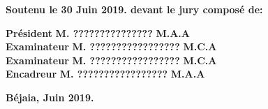\begin{titlepage}
\vspace{0.1cm}
\textbf{Soutenu le 30 Juin 2019. devant le jury composé de:}  \\
\begin{tabbing}
 \textbf{Président}  \hspace{1.2cm}\= \textbf{M. ???????????????} \hspace{2.4cm}\=\textbf{M.A.A} \\
 \textbf{Examinateur}    \> \textbf{M. ?????????????????} \>  \textbf{M.C.A}  \\
 \textbf{Examinateur}    \> \textbf{M. ?????????????????} \>  \textbf{M.C.A}  \\
 \textbf{Encadreur}     \> \textbf{M. ?????????????????}  \> \textbf{M.A.A}         \\
 \end{tabbing}

\vspace{0.1cm}
\begin{center}
\textbf{Béjaia, Juin 2019.}
\end{center}
\end{titlepage} 